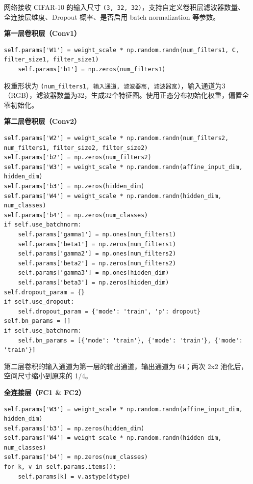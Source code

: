 网络接收 CIFAR-10 的输入尺寸 \lstinline|(3, 32, 32)|，支持自定义卷积层滤波器数量、全连接层维度、Dropout 概率、是否启用 batch normalization 等参数。

\textbf{第一层卷积层（Conv1）}

\begin{lstlisting}[style=cleanpython]
    self.params['W1'] = weight_scale * np.random.randn(num_filters1, C, filter_size1, filter_size1)
    self.params['b1'] = np.zeros(num_filters1)
\end{lstlisting}

权重形状为 \lstinline|(num_filters1, 输入通道, 滤波器高, 滤波器宽)|，输入通道为3（RGB），滤波器数量为32，生成32个特征图。使用正态分布初始化权重，偏置全零初始化。

\textbf{第二层卷积层（Conv2）}

\begin{lstlisting}[style=cleanpython]
self.params['W2'] = weight_scale * np.random.randn(num_filters2, num_filters1, filter_size2, filter_size2)
self.params['b2'] = np.zeros(num_filters2)
self.params['W3'] = weight_scale * np.random.randn(affine_input_dim, hidden_dim)
self.params['b3'] = np.zeros(hidden_dim)
self.params['W4'] = weight_scale * np.random.randn(hidden_dim, num_classes)
self.params['b4'] = np.zeros(num_classes)
if self.use_batchnorm:
    self.params['gamma1'] = np.ones(num_filters1)
    self.params['beta1'] = np.zeros(num_filters1)
    self.params['gamma2'] = np.ones(num_filters2)
    self.params['beta2'] = np.zeros(num_filters2)
    self.params['gamma3'] = np.ones(hidden_dim)
    self.params['beta3'] = np.zeros(hidden_dim)
self.dropout_param = {}
if self.use_dropout:
    self.dropout_param = {'mode': 'train', 'p': dropout}
self.bn_params = []
if self.use_batchnorm:
    self.bn_params = [{'mode': 'train'}, {'mode': 'train'}, {'mode': 'train'}]
\end{lstlisting}

第二层卷积的输入通道为第一层的输出通道，输出通道为 64；两次 2x2 池化后，空间尺寸缩小到原来的 1/4。

\textbf{全连接层（FC1 \& FC2）}

\begin{lstlisting}[style=cleanpython]
self.params['W3'] = weight_scale * np.random.randn(affine_input_dim, hidden_dim)
self.params['b3'] = np.zeros(hidden_dim)
self.params['W4'] = weight_scale * np.random.randn(hidden_dim, num_classes)
self.params['b4'] = np.zeros(num_classes)
for k, v in self.params.items():
    self.params[k] = v.astype(dtype)
\end{lstlisting}

